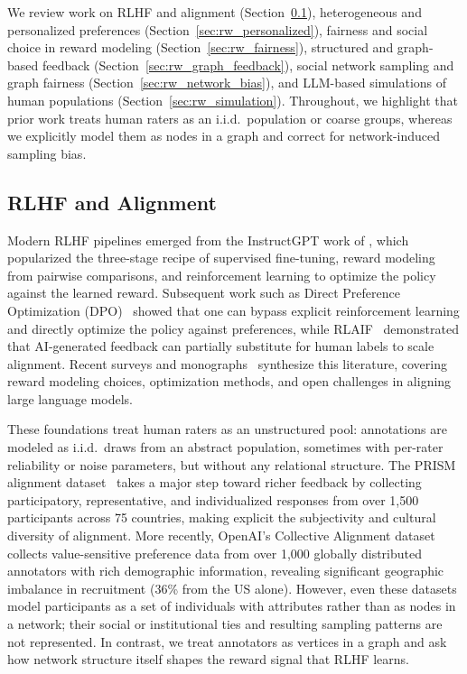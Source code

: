 \documentclass{article}
\theoremstyle{plain}
\theoremstyle{definition}
\theoremstyle{remark}
\begin{document}
We review work on RLHF and alignment (Section~\ref{sec:rw_rlhf}), heterogeneous and personalized preferences (Section~\ref{sec:rw_personalized}), fairness and social choice in reward modeling (Section~\ref{sec:rw_fairness}), structured and graph-based feedback (Section~\ref{sec:rw_graph_feedback}), social network sampling and graph fairness (Section~\ref{sec:rw_network_bias}), and LLM-based simulations of human populations (Section~\ref{sec:rw_simulation}).
Throughout, we highlight that prior work treats human raters as an i.i.d.\ population or coarse groups, whereas we explicitly model them as nodes in a graph and correct for network-induced sampling bias.

\subsection{RLHF and Alignment}
\label{sec:rw_rlhf}

Modern RLHF pipelines emerged from the InstructGPT work of \citet{ouyang2022instructgpt}, which popularized the three-stage recipe of supervised fine-tuning, reward modeling from pairwise comparisons, and reinforcement learning to optimize the policy against the learned reward.
Subsequent work such as Direct Preference Optimization (DPO)~\citep{rafailov2023dpo} showed that one can bypass explicit reinforcement learning and directly optimize the policy against preferences, while RLAIF~\citep{lee2024rlaif} demonstrated that AI-generated feedback can partially substitute for human labels to scale alignment.
Recent surveys and monographs~\citep{kaufmann2025survey,lambert2025rlhfbook,shen2023llmalignment} synthesize this literature, covering reward modeling choices, optimization methods, and open challenges in aligning large language models.

These foundations treat human raters as an unstructured pool: annotations are modeled as i.i.d.\ draws from an abstract population, sometimes with per-rater reliability or noise parameters, but without any relational structure.
The PRISM alignment dataset~\citep{kirk2024prism} takes a major step toward richer feedback by collecting participatory, representative, and individualized responses from over 1{,}500 participants across 75 countries, making explicit the subjectivity and cultural diversity of alignment.
More recently, OpenAI's Collective Alignment dataset~\citep{openai2025ca1} collects value-sensitive preference data from over 1{,}000 globally distributed annotators with rich demographic information, revealing significant geographic imbalance in recruitment (36\% from the US alone).
However, even these datasets model participants as a set of individuals with attributes rather than as nodes in a network; their social or institutional ties and resulting sampling patterns are not represented.
In contrast, we treat annotators as vertices in a graph and ask how network structure itself shapes the reward signal that RLHF learns.
\end{document}
